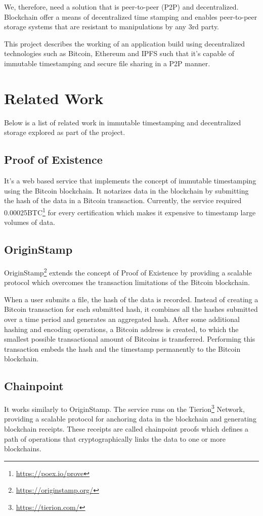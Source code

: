 \documentclass[]{report}
\begin{document}
		We, therefore, need a solution that is peer-to-peer (P2P) and decentralized. Blockchain offer a means of decentralized time stamping and enables peer-to-peer storage systems that are resistant to manipulations by any 3rd party.
		
		This project describes the working of an application build using decentralized technologies such as Bitcoin, Ethereum and IPFS such that it's capable of immutable timestamping and secure file sharing in a P2P manner.
	
	\section*{Related Work}
		Below is a list of related work in immutable timestamping and decentralized storage explored as part of the project.
		
		\subsection*{Proof of Existence}
			It's a web based service that implements the concept of immutable timestamping using the Bitcoin blockchain. It notarizes data in the blockchain by submitting the hash of the data in a Bitcoin transaction. Currently, the service required 0.00025BTC\footnote{\url{https://poex.io/prove}} for every certification which makes it expensive to timestamp large volumes of data.
			
		\subsection*{OriginStamp}
			OriginStamp\footnote{\url{https://originstamp.org/}} extends the concept of Proof of Existence by providing a scalable protocol which overcomes the transaction limitations of the Bitcoin blockchain.
			
			When a user submits a file, the hash of the data is recorded. Instead of creating a Bitcoin transaction for each submitted hash, it combines all the hashes submitted over a time period and generates an aggregated hash. After some additional hashing and encoding operations, a Bitcoin address is created, to which the smallest possible transactional amount of Bitcoins is transferred. Performing this transaction embeds the hash and the timestamp permanently to the Bitcoin blockchain.
			
		\subsection*{Chainpoint}
			It works similarly to OriginStamp. The service runs on the Tierion\footnote{\url{https://tierion.com/}} Network, providing a scalable protocol for anchoring data in the blockchain and generating blockchain receipts. These receipts are called chainpoint proofs which defines a path of operations that cryptographically links the data to one or more blockchains.
			
\end{document}
